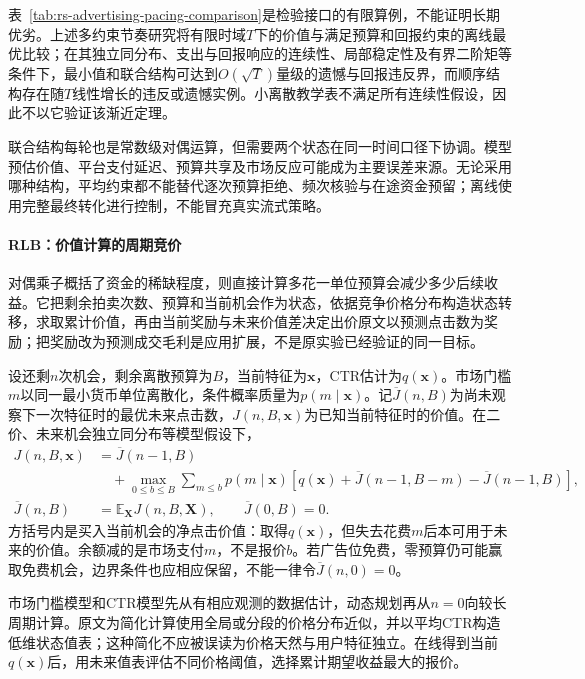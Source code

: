 表~\ref{tab:rs-advertising-pacing-comparison}是检验接口的有限算例，不能证明长期优劣。上述多约束节奏研究将有限时域$T$下的价值与满足预算和回报约束的离线最优比较；在其独立同分布、支出与回报响应的连续性、局部稳定性及有界二阶矩等条件下，最小值和联合结构可达到$O(\sqrt T)$量级的遗憾与回报违反界，而顺序结构存在随$T$线性增长的违反或遗憾实例。小离散教学表不满足所有连续性假设，因此不以它验证该渐近定理。

联合结构每轮也是常数级对偶运算，但需要两个状态在同一时间口径下协调。模型预估价值、平台支付延迟、预算共享及市场反应可能成为主要误差来源。无论采用哪种结构，平均约束都不能替代逐次预算拒绝、频次核验与在途资金预留；离线使用完整最终转化进行控制，不能冒充真实流式策略。

\paragraph{RLB：价值计算的周期竞价}
\label{sec:rs-advertising-rlb}

对偶乘子概括了资金的稀缺程度，则直接计算多花一单位预算会减少多少后续收益。它把剩余拍卖次数、预算和当前机会作为状态，依据竞争价格分布构造状态转移，求取累计价值，再由当前奖励与未来价值差决定出价原文以预测点击数为奖励；把奖励改为预测成交毛利是应用扩展，不是原实验已经验证的同一目标。

设还剩$n$次机会，剩余离散预算为$B$，当前特征为$\bm{x}$，CTR估计为$q(\bm{x})$。市场门槛$m$以同一最小货币单位离散化，条件概率质量为$p(m\mid\bm{x})$。记$\overline J(n,B)$为尚未观察下一次特征时的最优未来点击数，$J(n,B,\bm{x})$为已知当前特征时的价值。在二价、未来机会独立同分布等模型假设下，
\begin{equation}
  \begin{aligned}
    J(n,B,\bm{x})
     &=\overline J(n-1,B)\\
     &\quad+\max_{0\leq b\leq B}
       \sum_{m\leq b}p(m\mid\bm{x})
       \left[q(\bm{x})+\overline J(n-1,B-m)
                       -\overline J(n-1,B)\right],\\
    \overline J(n,B)&=\mathbb{E}_{\bm{X}}J(n,B,\bm{X}),
       \qquad \overline J(0,B)=0.
  \end{aligned}
  \label{eq:rs-advertising-rlb}
\end{equation}
方括号内是买入当前机会的净点击价值：取得$q(\bm{x})$，但失去花费$m$后本可用于未来的价值。余额减的是市场支付$m$，不是报价$b$。若广告位免费，零预算仍可能赢取免费机会，边界条件也应相应保留，不能一律令$\overline J(n,0)=0$。

市场门槛模型和CTR模型先从有相应观测的数据估计，动态规划再从$n=0$向较长周期计算。原文为简化计算使用全局或分段的价格分布近似，并以平均CTR构造低维状态值表；这种简化不应被误读为价格天然与用户特征独立。在线得到当前$q(\bm{x})$后，用未来值表评估不同价格阈值，选择累计期望收益最大的报价。

